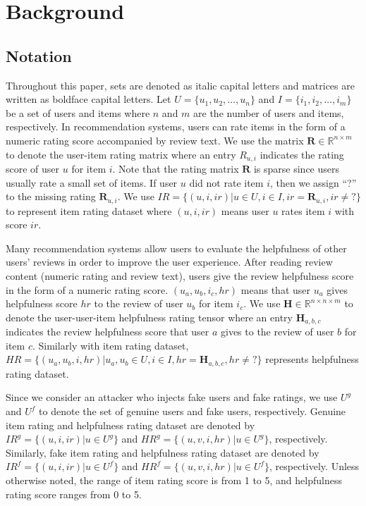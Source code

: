 \documentclass[master,english,final]{kaist-ucs}
\begin{document}
\chapter{Background}
\section{Notation}
Throughout this paper, sets are denoted as italic capital letters and matrices are written as boldface capital letters.
Let $U = \{u_1,u_2,…,u_n\}$ and $I = \{i_1,i_2,…,i_m\}$  be a set of users and items where $n$ and $m$ are the number of users and items, respectively.
In recommendation systems, users can rate items in the form of a numeric rating score accompanied by review text.
We use the matrix $ \bm{R} \in \mathbb{R}^{n \times m} $ to denote the user-item rating matrix where an entry $ R_{u,i} $ indicates the rating score of user $u$ for item $i$.
Note that the rating matrix $\bm{R}$ is sparse since users usually rate a small set of items.
If user $u$ did not rate item $i$, then we assign “?” to the missing rating $\bm{R}_{u,i}$.
We use $IR=\{(u,i,ir)| u \in U,i \in I,ir=\bm{R}_{u,i},ir \neq ? \}$ to represent item rating dataset where $(u,i,ir)$ means user $u$ rates item $i$ with score $ir$.

Many recommendation systems allow users to evaluate the helpfulness of other users’ reviews in order to improve the user experience.
After reading review content (numeric rating and review text), users give the review helpfulness score in the form of a numeric rating score.
$(u_a,u_b,i_c,hr)$ means that user $u_a$ gives helpfulness score $hr$ to the review of user $u_b$ for item $i_c$.
We use $\bm{H} \in \mathbb{R}^{n \times n \times m}$ to denote the user-user-item helpfulness rating tensor where an entry $\bm{H}_{a,b,c}$ indicates the review helpfulness score that user $a$ gives to the review of user $b$ for item $c$.
Similarly with item rating dataset, $HR=\{(u_a,u_b,i,hr)| u_a,u_b \in U,i \in I,hr=\bm{H}_{a,b,c},hr \neq ?\}$ represents helpfulness rating dataset.

Since we consider an attacker who injects fake users and fake ratings, we use $U^g$ and $U^f$ to denote the set of genuine users and fake users, respectively.
Genuine item rating and helpfulness rating dataset are denoted by $IR^g=\{(u,i,ir)|u \in U^g\}$ and $HR^g=\{(u,v,i,hr)|u \in U^g\}$, respectively.
Similarly, fake item rating and helpfulness rating dataset are denoted by $IR^f=\{(u,i,ir)|u \in U^f\}$ and $HR^f=\{(u,v,i,hr)|u \in U^f\}$, respectively.
Unless otherwise noted, the range of item rating score is from 1 to 5, and helpfulness rating score ranges from 0 to 5.
\end{document}
